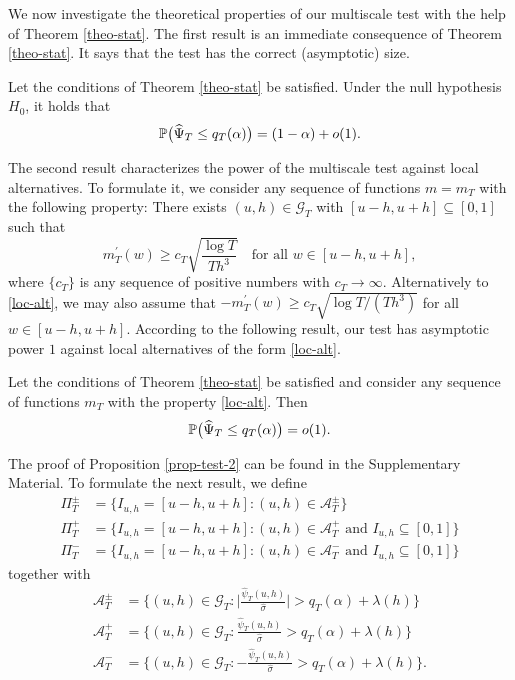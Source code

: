 We now investigate the theoretical properties of our multiscale test with the help of Theorem \ref{theo-stat}. The first result is an immediate consequence of Theorem \ref{theo-stat}. It says that the test has the correct (asymptotic) size. 
\begin{prop}\label{prop-test-1}
Let the conditions of Theorem \ref{theo-stat} be satisfied. Under the null hypothesis $H_0$, it holds that 
\[ \mathbb{P} \big( \widehat{\Psi}_T \le q_T(\alpha) \big) = (1 - \alpha) + o(1). \]
\end{prop}
The second result characterizes the power of the multiscale test against local alternatives. To formulate it, we consider any sequence of functions $m = m_T$ with the following property: There exists $(u,h) \in \mathcal{G}_T$ with $[u-h,u+h] \subseteq [0,1]$ such that 
\begin{equation}\label{loc-alt}
m_T^\prime(w) \ge c_T \sqrt{\frac{\log T}{Th^3}} \quad \text{for all } w \in [u-h,u+h], 
\end{equation}
where $\{c_T\}$ is any sequence of positive numbers with $c_T \rightarrow \infty$. Alternatively to \eqref{loc-alt}, we may also assume that $-m_T^\prime(w) \ge c_T \sqrt{\log T/(Th^3)}$ for all $w \in [u-h,u+h]$. According to the following result, our test has asymptotic power $1$ against local alternatives of the form \eqref{loc-alt}. 
\begin{prop}\label{prop-test-2}
Let the conditions of Theorem \ref{theo-stat} be satisfied and consider any sequence of functions $m_T$ with the property \eqref{loc-alt}. Then 
\[ \mathbb{P} \big( \widehat{\Psi}_T \le q_T(\alpha) \big) = o(1). \]
\end{prop}
The proof of Proposition \ref{prop-test-2} can be found in the Supplementary Material. To formulate the next result, we define 
\begin{align*}
\Pi_T^\pm   & = \big\{ I_{u,h} = [u-h,u+h]: (u,h) \in \mathcal{A}_T^\pm \big\} \\
\Pi_T^+ & = \big\{ I_{u,h} = [u-h,u+h]: (u,h) \in \mathcal{A}_T^+ \text{ and } I_{u,h} \subseteq [0,1] \big\} \\
\Pi_T^- & = \big\{ I_{u,h} = [u-h,u+h]: (u,h) \in \mathcal{A}_T^- \text{ and } I_{u,h} \subseteq [0,1] \big\} 
\end{align*}
together with 
\begin{align*}
\mathcal{A}_T^\pm & = \Big\{ (u,h) \in \mathcal{G}_T: \Big|\frac{\widehat{\psi}_T(u,h)}{\widehat{\sigma}}\Big| > q_T(\alpha) + \lambda(h) \Big\} \\ 
\mathcal{A}_T^+  & = \Big\{ (u,h) \in \mathcal{G}_T: \frac{\widehat{\psi}_T(u,h)}{\widehat{\sigma}} > q_T(\alpha) + \lambda(h) \Big\} \\ 
\mathcal{A}_T^-  & = \Big\{ (u,h) \in \mathcal{G}_T: -\frac{\widehat{\psi}_T(u,h)}{\widehat{\sigma}} > q_T(\alpha) + \lambda(h) \Big\}. 
\end{align*}
